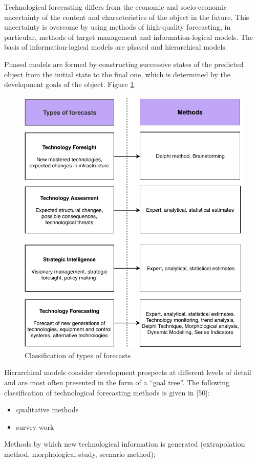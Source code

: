 \documentclass[12pt,twoside]{reedthesis}
\providecommand{\tightlist}{%
  \setlength{\itemsep}{0pt}\setlength{\parskip}{0pt}}
\begin{document}
Technological forecasting differs from the economic and socio-economic uncertainty of the content and characteristics of the object in the future. This uncertainty is overcome by using methods of high-quality forecasting, in particular, methods of target management and information-logical models. The basis of information-logical models are phased and hierarchical models.

Phased models are formed by constructing successive states of the predicted object from the initial state to the final one, which is determined by the development goals of the object. Figure \ref{fig:forecastingmethods}.
\begin{figure}[h]

{\centering \includegraphics[width=0.9\linewidth,]{figure/forecasting_methods} 

}

\caption{Classification of types of forecasts}\label{fig:forecastingmethods}
\end{figure}
Hierarchical models consider development prospects at different levels of detail and are most often presented in the form of a ``goal tree''. The following classification of technological forecasting methods is given in {[}50{]}:
\begin{itemize}
\tightlist
\item
  qualitative methods
\item
  survey work
\end{itemize}
Methods by which new technological information is generated (extrapolation method, morphological study, scenario method);
\end{document}
